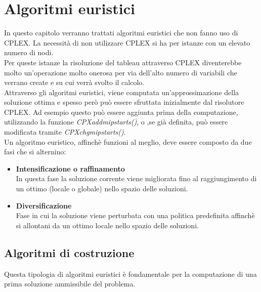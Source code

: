 \chapter{Algoritmi euristici}\label{HEURISTIC}
In questo capitolo verranno trattati algoritmi euristici che non fanno uso di CPLEX. La necessità di non utilizzare CPLEX si ha per istanze con un elevato numero di nodi.\\
Per queste istanze la risoluzione del tableau attraverso CPLEX diventerebbe molto un'operazione molto onerosa per via dell'alto numero di variabili che verrano create e su cui verrà svolto il calcolo.\\
Attraverso gli algoritmi euristici, viene computata un'approssimazione della soluzione ottima e spesso però può essere sfruttata inizialmente dal risolutore CPLEX. Ad esempio questo può essere aggiunta prima della computazione, utilizzando la funzione \textit{CPXaddmipstarts()}, o ,se già definita, può essere modificata tramite \textit{CPXchgmipstarts()}.\\
Un algoritmo euristico, affinchè funzioni al meglio, deve essere composto da due fasi che si alternino:
\begin{itemize}
\item{\textbf{Intensificazione o raffinamento}\\
In questa fase la soluzione corrente viene migliorata fino al raggiungimento di un ottimo (locale o globale) nello spazio delle soluzioni.
}
\item{\textbf{Diversificazione}\\
Fase in cui la soluzione viene perturbata con una politica predefinita affinchè si allontani da un ottimo locale nello spazio delle soluzioni.
}
\end{itemize}


\section{Algoritmi di costruzione}\label{construction_alg}
Questa tipologia di algoritmi euristici è fondamentale per la computazione di una prima soluzione ammissibile del problema.
